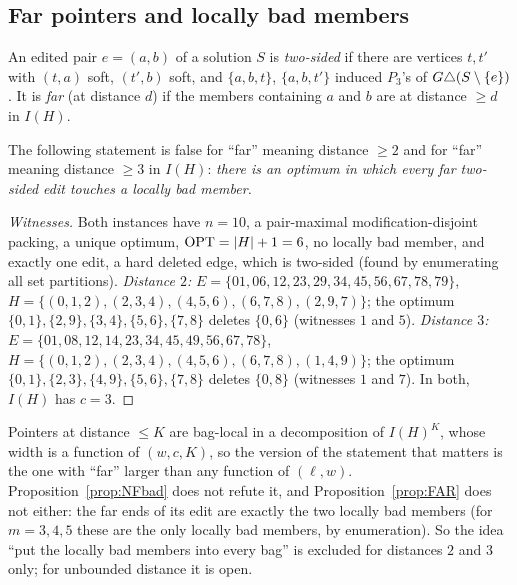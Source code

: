 \subsection{Far pointers and locally bad members}
An edited pair $e=(a,b)$ of a solution $S$ is \emph{two-sided} if there are vertices $t,t'$ with $(t,a)$ soft, $(t',b)$ soft, and $\{a,b,t\}$, $\{a,b,t'\}$ induced $P_3$'s of $G\triangle(S\setminus\{e\})$. It is \emph{far} (at distance $d$) if the members containing $a$ and $b$ are at distance $\ge d$ in $I(H)$.
\begin{proposition}\label{prop:NFbad}
The following statement is false for ``far'' meaning distance $\ge2$ and for ``far'' meaning distance $\ge3$ in $I(H)$: \emph{there is an optimum in which every far two-sided edit touches a locally bad member.}
\end{proposition}
\begin{proof}[Witnesses]
Both instances have $n=10$, a pair-maximal modification-disjoint packing, a unique optimum, $\mathrm{OPT}=|H|+1=6$, no locally bad member, and exactly one edit, a hard deleted edge, which is two-sided (found by enumerating all set partitions).
\emph{Distance $2$:} $E=\{01,\allowbreak 06,\allowbreak 12,\allowbreak 23,\allowbreak 29,\allowbreak 34,\allowbreak 45,\allowbreak 56,\allowbreak 67,\allowbreak 78,\allowbreak 79\}$, $H=\{(0,1,2),\allowbreak(2,3,4),\allowbreak(4,5,6),\allowbreak(6,7,8),\allowbreak(2,9,7)\}$; the optimum $\{0,1\},\{2,9\},\{3,4\},\{5,6\},\{7,8\}$ deletes $\{0,6\}$ (witnesses $1$ and $5$).
\emph{Distance $3$:} $E=\{01,\allowbreak 08,\allowbreak 12,\allowbreak 14,\allowbreak 23,\allowbreak 34,\allowbreak 45,\allowbreak 49,\allowbreak 56,\allowbreak 67,\allowbreak 78\}$, $H=\{(0,1,2),\allowbreak(2,3,4),\allowbreak(4,5,6),\allowbreak(6,7,8),\allowbreak(1,4,9)\}$; the optimum $\{0,1\},\{2,3\},\{4,9\},\{5,6\},\{7,8\}$ deletes $\{0,8\}$ (witnesses $1$ and $7$). In both, $I(H)$ has $c=3$.
\end{proof}
\begin{remark}[Scope]\label{rem:NFscope}
Pointers at distance $\le K$ are bag-local in a decomposition of $I(H)^K$, whose width is a function of $(w,c,K)$, so the version of the statement that matters is the one with ``far'' larger than any function of $(\ell,w)$. Proposition~\ref{prop:NFbad} does not refute it, and Proposition~\ref{prop:FAR} does not either: the far ends of its edit are exactly the two locally bad members (for $m=3,4,5$ these are the only locally bad members, by enumeration). So the idea ``put the locally bad members into every bag'' is excluded for distances $2$ and $3$ only; for unbounded distance it is open.
\end{remark}

